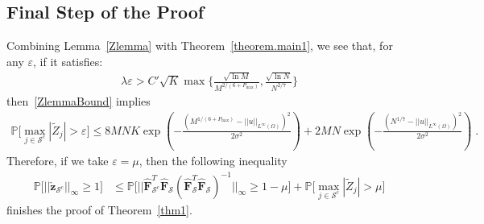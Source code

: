 \documentclass[a4paper,11pt]{article}
\newcommand{\bF}{\mathbf{F}}
\newcommand{\mS}{\mathcal{S}}
\begin{document}
\subsection{Final Step of the Proof}
Combining Lemma~\ref{Zlemma} with Theorem~\ref{theorem.main1}, we see that, for any $\varepsilon$, if it satisfies:
\begin{align}
\lambda\varepsilon>C'\sqrt{K}\max\{\frac{\sqrt{\ln M}}{M^{2/(6+P_{\max})}},\frac{\sqrt{\ln N}}{N^{2/7}}\}
\end{align}
then~\eqref{ZlemmaBound} implies
\begin{align}
\mathbb{P}\Big[\max_{j\in \mS^c}|\widetilde{Z}_j|>\varepsilon\Big]\leq 8MNK \exp(-\frac{(M^{1/(6+P_{\max})}-||u||_{L^\infty(\Omega)})^2}{2\sigma^2})+2MN \exp(-\frac{(N^{1/7}-||u||_{L^\infty(\Omega)})^2}{2\sigma^2})\;.
\end{align}
Therefore, if we take $\varepsilon= \mu$, then the following inequality
\begin{align}
\mathbb{P}\Big[||\check{\mathbf{z}}_{\mS^c}||_\infty	\geq1\Big]&\leq \mathbb{P}\Big[||\widehat{\bF}_{\mS^c}^T\widehat{\bF}_\mS(\widehat{\bF}_{\mS}^T\widehat{\bF}_\mS)^{-1}||_\infty\geq 1-\mu\Big]+\mathbb{P}\Big[\max_{j\in \mS^c}|\widetilde{Z}_j|>\mu\Big]
\end{align}
finishes the proof of Theorem~\ref{thm1}.
\end{document}
